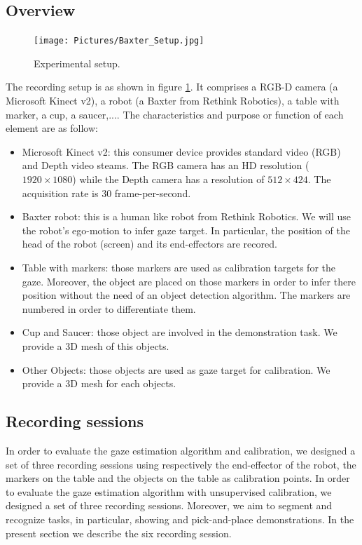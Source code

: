 \documentclass[11pt,a4paper]{article}
\begin{document}
\subsection{Overview}
\label{Overview}
\begin{figure}[!ht]
\begin{center}
\texttt{[image: Pictures/Baxter\_Setup.jpg]}
\end{center}
\caption{Experimental setup. \label{Experimental_Setup}}
\end{figure}
The recording setup is as shown in figure \ref{Experimental_Setup}. It comprises a RGB-D camera (a Microsoft Kinect v2), a robot (a Baxter from Rethink Robotics), a table with marker, a cup, a saucer,.... The characteristics and purpose or function of each element are as follow:
\begin{itemize}
\item Microsoft Kinect v2: this consumer device provides standard video (RGB) and Depth video steams. The RGB camera has an HD resolution ($1920 \times 1080$) while the Depth camera has a resolution of $512 \times 424$. The acquisition rate is 30 frame-per-second.
\item Baxter robot: this is a human like robot from Rethink Robotics. We will use the robot's ego-motion to infer gaze target. In particular, the position of the head of the robot (screen) and its end-effectors are recored.
\item Table with markers: those markers are used as calibration targets for the gaze. Moreover, the object are placed on those markers in order to infer there position without the need of an object detection algorithm. The markers are numbered in order to differentiate them.
\item Cup and Saucer: those object are involved in the demonstration task. We provide a 3D mesh of this objects.
\item Other Objects: those objects are used as gaze target for calibration. We provide a 3D mesh for each objects.
\end{itemize}

\subsection{Recording sessions}
In order to evaluate the gaze estimation algorithm and calibration, we designed a set of three recording sessions using respectively the end-effector of the robot, the markers on the table and the objects on the table as calibration points. In order to evaluate the gaze estimation algorithm with unsupervised calibration, we designed a set of three recording sessions. Moreover, we aim to segment and recognize tasks, in particular, showing and pick-and-place demonstrations. In the present section we describe the six recording session.
\end{document}
